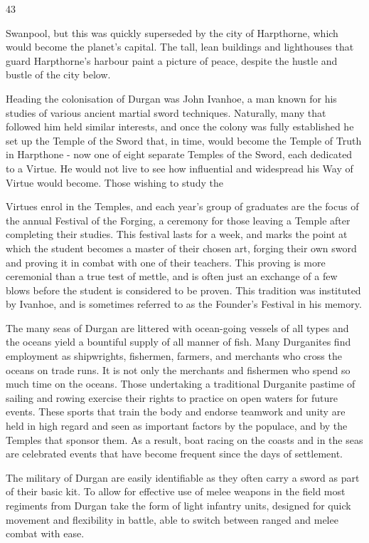 \documentclass{scrbook}
\begin{document}
43

Swanpool, but this was quickly superseded by the city of Harpthorne, which would become the planet's capital. The tall, lean buildings and lighthouses that guard Harpthorne's harbour paint a picture of peace, despite the hustle and bustle of the city below.

Heading the colonisation of Durgan was John Ivanhoe, a man known for his studies of various ancient martial sword techniques. Naturally, many that followed him held similar interests, and once the colony was fully established he set up the Temple of the Sword that, in time, would become the Temple of Truth in Harpthone - now one of eight separate Temples of the Sword, each dedicated to a Virtue. He would not live to see how influential and widespread his Way of Virtue would become. Those wishing to study the

Virtues enrol in the Temples, and each year's group of graduates are the focus of the annual Festival of the Forging, a ceremony for those leaving a Temple after completing their studies. This festival lasts for a week, and marks the point at which the student becomes a master of their chosen art, forging their own sword and proving it in combat with one of their teachers. This proving is more ceremonial than a true test of mettle, and is often just an exchange of a few blows before the student is considered to be proven. This tradition was instituted by Ivanhoe, and is sometimes referred to as the Founder's Festival in his memory.

The many seas of Durgan are littered with ocean-going vessels of all types and the oceans yield a bountiful supply of all manner of fish. Many Durganites find employment as shipwrights, fishermen, farmers, and merchants who cross the oceans on trade runs. It is not only the merchants and fishermen who spend so much time on the oceans. Those undertaking a traditional Durganite pastime of sailing and rowing exercise their rights to practice on open waters for future events. These sports that train the body and endorse teamwork and unity are held in high regard and seen as important factors by the populace, and by the Temples that sponsor them. As a result, boat racing on the coasts and in the seas are celebrated events that have become frequent since the days of settlement.

The military of Durgan are easily identifiable as they often carry a sword as part of their basic kit. To allow for effective use of melee weapons in the field most regiments from Durgan take the form of light infantry units, designed for quick movement and flexibility in battle, able to switch between ranged and melee combat with ease.
\end{document}
